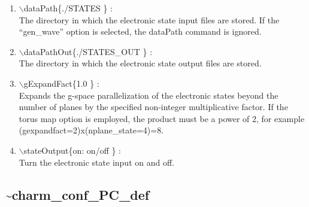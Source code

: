 \documentclass[12pt,titlepage]{article}
\begin{document}
\begin{enumerate}
  \vspace{0.15in} 
  \item $\backslash$dataPath\{./STATES \} : \\    
  The directory in which the electronic state input files are
  stored. If the ``gen\_wave'' option is selected, the dataPath
  command is ignored.
  \vspace{0.15in} 
  \item $\backslash$dataPathOut\{./STATES\_OUT \} : \\    
  The directory in which the electronic state output files are stored.
  \vspace{0.15in} 
  \item $\backslash$gExpandFact\{1.0 \} : \\    
  Expands the g-space parallelization of the electronic states beyond the number of planes by
  the specified non-integer multiplicative factor. If the torus map option is
  employed, the product must be a power of 2, for example 
 (gexpandfact=2)x(nplane\_state=4)=8.
  \vspace{0.15in} 
  \item $\backslash$stateOutput\{on: on/off \} : \\    
  Turn the electronic state input on and off.
\end{enumerate}

\newpage
\subsection*{\bf \~{ }charm\_conf\_PC\_def}
\end{document}

